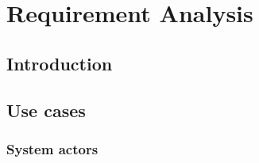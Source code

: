 \chapter{Requirement Analysis}
\label{chap:use-case}

\section{Introduction}
\label{sec:introduction}
\section{Use cases}
\label{sec:use-cases}

\subsection{System actors}
\label{subsec:system-actors}